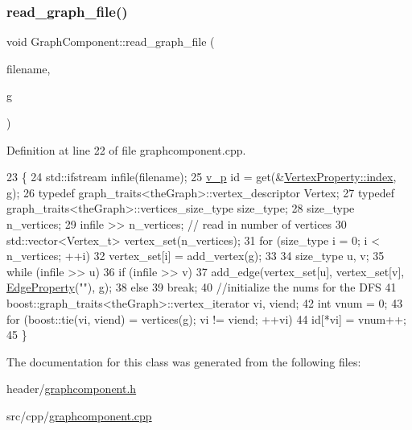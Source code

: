 \subsubsection{\texorpdfstring{read\+\_\+graph\+\_\+file()}{read\_graph\_file()}}
{\footnotesize\ttfamily void Graph\+Component\+::read\+\_\+graph\+\_\+file (\begin{DoxyParamCaption}\item[{std\+::string}]{filename,  }\item[{\hyperlink{class_graph_component_a982e0748a6e1b8dc74986f5f8b3dca5c}{the\+Graph} \&}]{g }\end{DoxyParamCaption})}



Definition at line 22 of file graphcomponent.\+cpp.


\begin{DoxyCode}
23 \{
24     std::ifstream infile(filename);
25     \hyperlink{utilities_8h_a3f4959b3d837fa6351a9414c79280286}{v\_p} \textcolor{keywordtype}{id} = \textcolor{keyword}{get}(&\hyperlink{struct_utility_structs_1_1_vertex_property_a636cb729438e999aa3d9a17ac39d8641}{VertexProperty::index}, g);
26     \textcolor{keyword}{typedef} graph\_traits<theGraph>::vertex\_descriptor Vertex;
27     \textcolor{keyword}{typedef} graph\_traits<theGraph>::vertices\_size\_type size\_type;
28     size\_type n\_vertices;
29     infile >> n\_vertices; \textcolor{comment}{// read in number of vertices}
30     std::vector<Vertex\_t> vertex\_set(n\_vertices);
31     \textcolor{keywordflow}{for} (size\_type i = 0; i < n\_vertices; ++i)
32         vertex\_set[i] = add\_vertex(g);
33 
34     size\_type u, v;
35     \textcolor{keywordflow}{while} (infile >> u)
36         \textcolor{keywordflow}{if} (infile >> v)
37             add\_edge(vertex\_set[u], vertex\_set[v], \hyperlink{class_graph_component_ae2f6ef4a3ac656d8213df42aa3d4c3b3}{EdgeProperty}(\textcolor{stringliteral}{""}), g);
38         \textcolor{keywordflow}{else}
39             \textcolor{keywordflow}{break};
40     \textcolor{comment}{//initialize the nums for the DFS}
41     boost::graph\_traits<theGraph>::vertex\_iterator vi, viend;
42     \textcolor{keywordtype}{int} vnum = 0;
43     \textcolor{keywordflow}{for} (boost::tie(vi, viend) = vertices(g); vi != viend; ++vi)
44         \textcolor{keywordtype}{id}[*vi] = vnum++;
45 \}
\end{DoxyCode}


The documentation for this class was generated from the following files\+:\begin{DoxyCompactItemize}
\item 
header/\hyperlink{graphcomponent_8h}{graphcomponent.\+h}\item 
src/cpp/\hyperlink{graphcomponent_8cpp}{graphcomponent.\+cpp}\end{DoxyCompactItemize}
